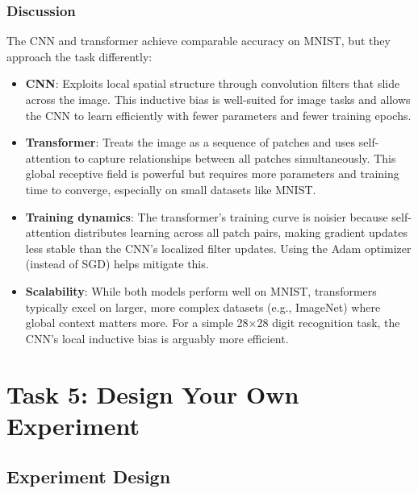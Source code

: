 \documentclass[11pt]{article}
\begin{document}
\subsubsection{Discussion}

The CNN and transformer achieve comparable accuracy on MNIST, but they approach the task differently:

\begin{itemize}
    \item \textbf{CNN}: Exploits local spatial structure through convolution filters that slide across the image. This inductive bias is well-suited for image tasks and allows the CNN to learn efficiently with fewer parameters and fewer training epochs.
    
    \item \textbf{Transformer}: Treats the image as a sequence of patches and uses self-attention to capture relationships between all patches simultaneously. This global receptive field is powerful but requires more parameters and training time to converge, especially on small datasets like MNIST.
    
    \item \textbf{Training dynamics}: The transformer's training curve is noisier because self-attention distributes learning across all patch pairs, making gradient updates less stable than the CNN's localized filter updates. Using the Adam optimizer (instead of SGD) helps mitigate this.
    
    \item \textbf{Scalability}: While both models perform well on MNIST, transformers typically excel on larger, more complex datasets (e.g., ImageNet) where global context matters more. For a simple 28$\times$28 digit recognition task, the CNN's local inductive bias is arguably more efficient.
\end{itemize}

\section{Task 5: Design Your Own Experiment}


\subsection{Experiment Design}

\end{document}
